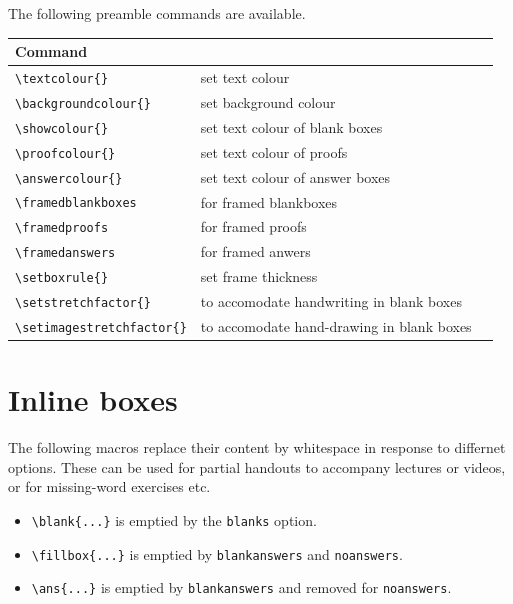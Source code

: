 \documentclass{article}
\theoremstyle{break}
\begin{document}
\framebreak
The following preamble commands are available.
\begin{table}[htb]
\renewcommand{\arraystretch}{1.3}
\addtolength{\tabcolsep}{2ex}
\begin{tabular}{lll}
\hline\hline
Command							& \hspace{0.3\textwidth}\mbox{}\\
\hline\hline
\verb+\textcolour{}+			&  set text colour\\
\verb+\backgroundcolour{}+		&  set background colour \\
\verb+\showcolour{}+			&  set text colour of blank boxes\\
\verb+\proofcolour{}+			&  set text colour of proofs \\
\verb+\answercolour{}+			&  set text colour of answer boxes \\
\hline
\verb+\framedblankboxes+		&  for framed blankboxes \\
\verb+\framedproofs+			&  for framed proofs\\
\verb+\framedanswers+			&  for framed anwers\\
\verb+\setboxrule{}+			&  set frame thickness\\
\hline
\verb+\setstretchfactor{}+		&  to accomodate handwriting in blank boxes\\
\verb+\setimagestretchfactor{}+	&  to accomodate hand-drawing in blank boxes\\
\hline\hline
\end{tabular}
\end{table}

\section{Inline boxes}
The following macros replace their content by whitespace in response to differnet options. These can be used for partial handouts to accompany lectures or videos, or for missing-word exercises etc.
\begin{itemize}
\item \verb+\blank{...}+ is emptied by the {\tt blanks} option.
\item \verb+\fillbox{...}+ is emptied by {\tt blankanswers} and {\tt noanswers}.
\item \verb+\ans{...}+ is emptied by {\tt blankanswers} and removed for {\tt noanswers}.
\end{itemize}
\end{document}
